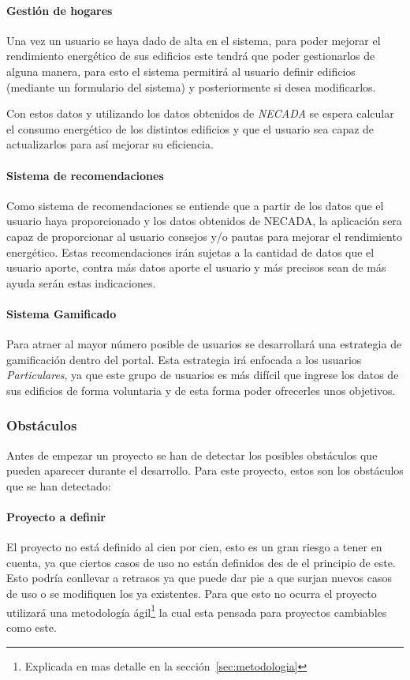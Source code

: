 \paragraph{Gestión de hogares}
Una vez un usuario se haya dado de alta en el sistema, para poder mejorar el rendimiento energético de sus edificios este tendrá que poder gestionarlos de alguna manera, para esto el sistema permitirá al usuario definir edificios (mediante un formulario del sistema) y posteriormente si desea modificarlos.

  Con estos datos y utilizando los datos obtenidos de \textit{NECADA} se espera calcular el consumo energético de los distintos edificios y que el usuario sea capaz de actualizarlos para así mejorar su eficiencia.
\paragraph{Sistema de recomendaciones}
Como sistema de recomendaciones se entiende que a partir de los datos que el usuario haya proporcionado y los datos obtenidos de NECADA, la aplicación sera capaz de proporcionar al usuario consejos y/o pautas para mejorar el rendimiento energético. Estas recomendaciones irán sujetas a la cantidad de datos que el usuario aporte, contra más datos aporte el usuario y más precisos sean de más ayuda serán estas indicaciones.
\paragraph{Sistema Gamificado}
Para atraer al mayor número posible de usuarios se desarrollará una estrategia de gamificación dentro del portal. Esta estrategia irá enfocada a los usuarios \textit{Particulares}, ya que este grupo de usuarios es más difícil que ingrese los datos de sus edificios de forma voluntaria y de esta forma poder ofrecerles unos objetivos.

\subsubsection{Obstáculos}
Antes de empezar un proyecto se han de detectar los posibles obstáculos que pueden aparecer durante el desarrollo. Para este proyecto, estos son los obstáculos que se han detectado:
\paragraph{Proyecto a definir}
El proyecto no está definido al cien por cien, esto es un gran riesgo a tener en cuenta, ya que ciertos casos de uso no están definidos des de el principio de este. Esto podría conllevar a retrasos ya que puede dar pie a que surjan nuevos casos de uso o se modifiquen los ya existentes.
Para que esto no ocurra el proyecto utilizará una metodología ágil\footnote{Explicada en mas detalle en la sección~\ref{sec:metodologia}} la cual esta pensada para proyectos cambiables como este.
